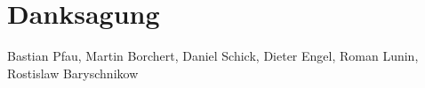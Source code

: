 \chapter*{Danksagung}
Bastian Pfau, Martin Borchert, Daniel Schick, Dieter Engel, Roman Lunin, Rostislaw Baryschnikow